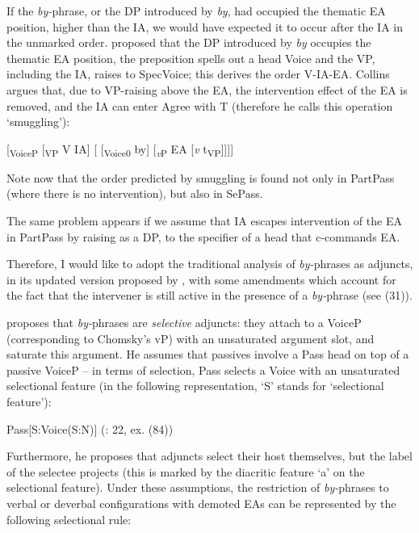 \documentclass[output=paper]{langsci/langscibook}
\begin{document}
If the \textit{by-}phrase, or the DP introduced by \textit{by}, had occupied the thematic EA position, higher than the IA, we would have expected it to occur after the IA in the unmarked order. \citet{Collins2005} proposed that the DP introduced by \textit{by} occupies the thematic EA position, the preposition spells out a head Voice and the VP, including the IA, raises to SpecVoice; this derives the order V-IA-EA. Collins argues that, due to VP-raising above the EA, the intervention effect of the EA is removed, and the IA can enter Agree with T (therefore he calls this operation ‘smuggling’):

\ea%
    \label{ex:giurgea:30}
    [\textsubscript{VoiceP}  [\textsubscript{VP} V IA] [ [\textsubscript{Voice0}  by] [\textit{\textsubscript{v}}\textsubscript{P} EA [\textit{v} t\textsubscript{VP}]]]]
    \z

Note now that the order predicted by smuggling is found not only in PartPass (where there is no intervention), but also in SePass. 

  The same problem appears if we assume that IA escapes intervention of the EA in PartPass by raising as a DP, to the specifier of a head that c-commands EA.

  Therefore, I would like to adopt the traditional analysis of \textit{by-}phrases as adjuncts, in its updated version proposed by \citet{Bruening2012}, with some amendments which account for the fact that the intervener is still active in the presence of a \textit{by-}phrase (see (31)).

    \z

\citet{Bruening2012} proposes that \textit{by-}phrases are \textit{selective} adjuncts: they attach to a VoiceP (corresponding to Chomsky’s vP) with an unsaturated argument slot, and saturate this argument. He assumes that passives involve a Pass head on top of a passive VoiceP – in terms of selection, Pass selects a Voice with an unsaturated selectional feature (in the following representation, ‘S’ stands for ‘selectional feature’):

\ea%
    \label{ex:giurgea:32}
    Pass[S:Voice(S:N)]  (\citealt{Bruening2012}: 22, ex. (84))
\z

Furthermore, he proposes that adjuncts select their host themselves, but the label of the selectee projects (this is marked by the diacritic feature ‘a’ on the selectional feature). Under these assumptions, the restriction of \textit{by-}phrases to verbal or deverbal configurations with demoted EAs can be represented by the following selectional rule:
\end{document}

